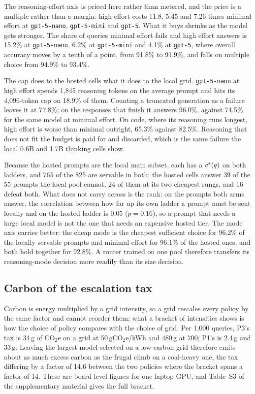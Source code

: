 The reasoning-effort axis is priced here rather than metered, and the price
is a multiple rather than a margin: high effort costs 11.8, 5.45 and 7.26
times minimal effort at \texttt{gpt-5-nano}, \texttt{gpt-5-mini} and
\texttt{gpt-5}. What it buys shrinks as the model gets stronger. The share of
queries minimal effort fails and high effort answers is 15.2\% at
\texttt{gpt-5-nano}, 6.2\% at \texttt{gpt-5-mini} and 4.1\% at
\texttt{gpt-5}, where overall accuracy moves by a tenth of a point, from
91.8\% to 91.9\%, and falls on multiple choice from 94.9\% to 93.4\%.

The cap does to the hosted cells what it does to the local grid.
\texttt{gpt-5-nano} at high effort spends 1{,}845 reasoning tokens on the
average prompt and hits its 4{,}096-token cap on 18.9\% of them. Counting a
truncated generation as a failure leaves it at 77.8\%; on the responses that
finish it answers 96.0\%, against 74.5\% for the same model at minimal
effort. On code, where its reasoning runs longest, high effort is worse than
minimal outright, 65.3\% against 82.5\%. Reasoning that does not fit the
budget is paid for and discarded, which is the same failure the local 0.6B
and 1.7B thinking cells show.

Because the hosted prompts are the local main subset, each has a $c^{*}(q)$
on both ladders, and 765 of the 825 are servable in both; the hosted cells
answer 39 of the 55 prompts the local pool cannot, 24 of them at its two
cheapest rungs, and 16 defeat both. What does not carry across is the rank:
on the prompts both arms answer, the correlation between how far up its own
ladder a prompt must be sent locally and on the hosted ladder is 0.05
($p = 0.16$), so a prompt that needs a large local model is not the one that
needs an expensive hosted tier. The mode axis carries better: the cheap mode
is the cheapest sufficient choice for 96.2\% of the locally servable prompts
and minimal effort for 96.1\% of the hosted ones, and both hold together for
92.8\%. A router trained on one pool therefore transfers its reasoning-mode
decision more readily than its size decision.

\subsection{Carbon of the escalation tax}
\label{sec:results-carbon}

Carbon is energy multiplied by a grid intensity, so a grid rescales every
policy by the same factor and cannot reorder them; what a bracket of
intensities shows is how the choice of policy compares with the choice of
grid. Per 1{,}000 queries, P3's tax is 34\,g of CO$_2$e on a grid at
50\,gCO$_2$e/kWh and 480\,g at 700; P1's is 2.4\,g and 33\,g. Leaving the
largest model selected on a low-carbon grid therefore emits about as much
excess carbon as the frugal climb on a coal-heavy one, the tax differing by a
factor of 14.6 between the two policies where the bracket spans a factor of
14. These are board-level figures for one laptop GPU, and Table~S3 of the
supplementary material gives the full bracket.
